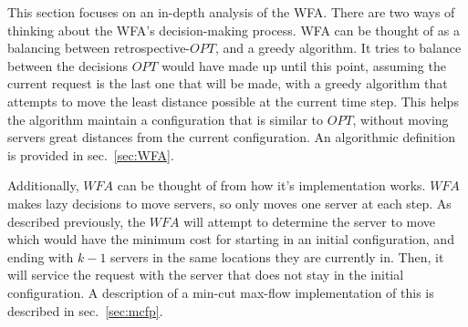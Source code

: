 This section focuses on an in-depth analysis of the WFA. There are two ways of thinking about the WFA's decision-making process. WFA can be thought of as a balancing between retrospective-$OPT$, and a greedy algorithm. It tries to balance between the decisions $OPT$ would have made up until this point, assuming the current request is the last one that will be made, with a greedy algorithm that attempts to move the least distance possible at the current time step. This helps the algorithm maintain a configuration that is similar to $OPT$, without moving servers great distances from the current configuration. An algorithmic definition is provided in sec.~\ref{sec:WFA}.

Additionally, $WFA$ can be thought of from how it's implementation works. $WFA$ makes lazy decisions to move servers, so only moves one server at each step. As described previously, the $WFA$ will attempt to determine the server to move which would have the minimum cost for starting in an initial configuration, and ending with $k-1$ servers in the same locations they are currently in. Then, it will service the request with the server that does not stay in the initial configuration. A description of a min-cut max-flow implementation of this is described in sec.~\ref{sec:mcfp}.